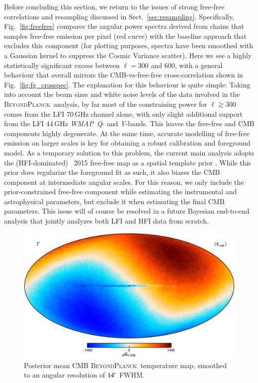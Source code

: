 \documentclass[twocolumn]{aa}
\def\WMAP{\textit{WMAP}}
\newcommand{\red}[0]{\color{red}}
\newcommand{\BP}{\textsc{BeyondPlanck}}
\begin{document}
Before concluding this section, we return to the issues of strong
free-free correlations and resampling discussed in
Sect.~\ref{sec:resampling}. Specifically, Fig.~\ref{fig:freefree}
compares the angular power spectra derived from chains that samples free-free emission per pixel (red curve) with the baseline approach that excludes this
component ({\red for plotting purposes, spectra have been smoothed with a Gaussian kernel to suppress the Cosmic Variance scatter}). Here we see a highly statistically significant excess
between $\ell=300$ and 600, with a general behaviour that overall
mirrors the CMB-vs-free-free cross-correlation shown in
Fig.~\ref{fig:fg_crosspec}. The explanation for this behaviour is
quite simple: Taking into account the beam sizes and white noise
levels of the data involved in the \BP\ analysis, by far most of the
constraining power for $\ell\gtrsim300$ comes from the LFI 70\,GHz
channel alone, with only slight additional support from the LFI
44\,GHz \WMAP\ \textit Q- and \textit V-bands. This leaves the free-free and CMB
components highly degenerate. At the same time, accurate modelling of
free-free emission on larger scales is key for obtaining a robust
calibration and foreground model. As a temporary solution to this
problem, the current main analysis adopts the (HFI-dominated)
\Planck\ 2015 free-free map as a spatial template prior
\citep{bp13}. While this prior does regularize the foreground fit as
such, it also biases the CMB component at intermediate angular
scales. For this reason, we only include the prior-constrained
free-free component while estimating the instrumental and
astrophysical parameters, but exclude it when estimating the final CMB
parameters. This issue will of course be resolved in a future Bayesian
end-to-end analysis that jointly analyzes both LFI and HFI data from
scratch.

\begin{figure}[t]
  \center
  \includegraphics[width=0.9\linewidth]{figs/BP_cmb_BP10_I_MEAN_w18_n1024_cb_c-planck.pdf}
  \caption{Posterior mean CMB \BP\ temperature map, smoothed to an
    angular resolution of $14\arcm$ FWHM.}\label{fig:cmb_with_dipole}
\end{figure}
\end{document}
